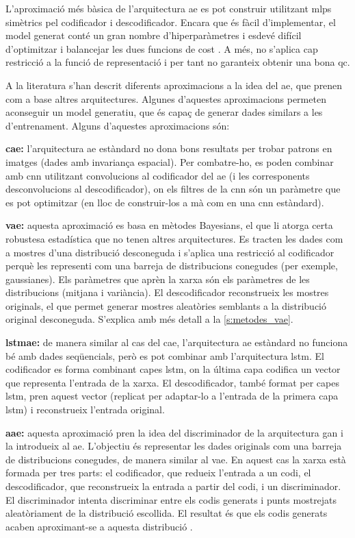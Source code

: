 \documentclass[CAT,BIB]{TFUOC}%
\begin{document}
        L'aproximació més bàsica de l'arquitectura \gls{ae} es pot construir utilitzant \glspl{mlp} simètrics pel codificador i descodificador. Encara que és fàcil d'implementar, el model generat conté un gran nombre d'hiperparàmetres i esdevé difícil d'optimitzar i balancejar les dues funcions de cost \citep{Karim2021}. A més, no s'aplica cap restricció a la funció de representació i per tant no garanteix obtenir una bona \gls{qc}.

        A la literatura s'han descrit diferents aproximacions a la idea del \gls{ae}, que prenen com a base altres arquitectures. Algunes d'aquestes aproximacions permeten aconseguir un model generatiu, que és capaç de generar dades similars a les d'entrenament. Alguns d'aquestes aproximacions són:

        \textbf{\Gls{cae}:} l'arquitectura \gls{ae} estàndard no dona bons resultats per trobar patrons en imatges (dades amb invariança espacial). Per combatre-ho, es poden combinar amb \gls{cnn} utilitzant convolucions al codificador del \gls{ae} (i les corresponents desconvolucions al descodificador), on els filtres de la \gls{cnn} són un paràmetre que es pot optimitzar (en lloc de construir-los a mà com en una \gls{cnn} estàndard).

        \textbf{\Gls{vae}:} aquesta aproximació es basa en mètodes Bayesians, el que li atorga certa robustesa estadística que no tenen altres arquitectures. Es tracten les dades com a mostres d'una distribució desconeguda i s'aplica una restricció al codificador perquè les representi com una barreja de distribucions conegudes (per exemple, gaussianes). Els paràmetres que aprèn la xarxa són els paràmetres de les distribucions (mitjana i variància). El descodificador reconstrueix les mostres originals, el que permet generar mostres aleatòries semblants a la distribució original desconeguda. S'explica amb més detall a la \cref{s:metodes_vae}.

        \textbf{\Gls{lstmae}:} de manera similar al cas del \gls{cae}, l'arquitectura \gls{ae} estàndard no funciona bé amb dades seqüencials, però es pot combinar amb l'arquitectura \gls{lstm}. El codificador es forma combinant capes \gls{lstm}, on la última capa codifica un vector que representa l'entrada de la xarxa. El descodificador, també format per capes \gls{lstm}, pren aquest vector (replicat per adaptar-lo a l'entrada de la primera capa \gls{lstm}) i reconstrueix l'entrada original.

        \textbf{\Gls{aae}:} aquesta aproximació pren la idea del discriminador de la arquitectura \gls{gan} i la introdueix al \gls{ae}. L'objectiu és representar les dades originals com una barreja de distribucions conegudes, de manera similar al \gls{vae}. En aquest cas la xarxa està formada per tres parts: el codificador, que redueix l'entrada a un codi, el descodificador, que reconstrueix la entrada a partir del codi, i un discriminador. El discriminador intenta discriminar entre els codis generats i punts mostrejats aleatòriament de la distribució escollida. El resultat és que els codis generats acaben aproximant-se a aquesta distribució \citep{Makhzani2015}.
\end{document}
